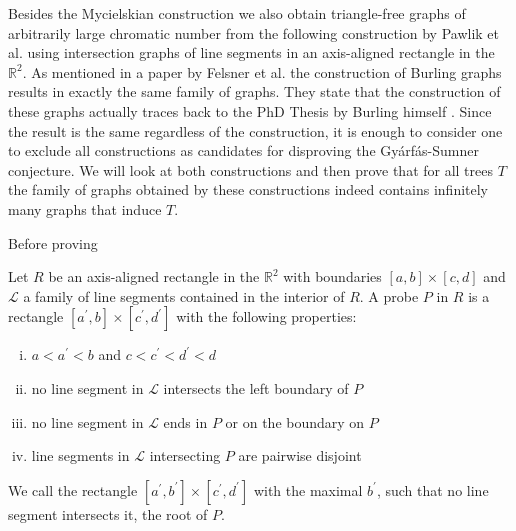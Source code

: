 Besides the Mycielskian construction we also obtain triangle-free graphs of arbitrarily large chromatic number from the following construction by Pawlik et al. \cite{Paw14} using intersection graphs of line segments in an axis-aligned rectangle in the $\mathbb{R}^2$. As mentioned in a paper by Felsner et al. \cite{Fe18} the construction of Burling graphs results in exactly the same family of graphs. They state that the construction of these graphs actually traces back to the PhD Thesis by Burling himself \cite{Bu65}. Since the result is the same regardless of the construction, it is enough to consider one to exclude all constructions as candidates for disproving the Gyárfás-Sumner conjecture. We will look at both constructions and then prove that for all trees $T$ the family of graphs obtained by these constructions indeed contains infinitely many graphs that induce $T$.

Before proving 

\begin{defn}
Let $R$ be an axis-aligned rectangle in the $\mathbb{R}^2$ with boundaries $[a,b]\times [c,d]$ and $\mathcal{L}$ a family of line segments contained in the interior of $R$. A probe $P$ in $R$ is a rectangle $[a^\prime ,b]\times [c^\prime ,d^\prime]$ with the following properties:
\begin{enumerate}[(i)]
\item $a<a^\prime < b$ and $c<c^\prime <d^\prime < d$
\item no line segment in $\mathcal{L}$ intersects the left boundary of $P$
\item no line segment in $\mathcal{L}$ ends in $P$ or on the boundary on $P$
\item line segments in $\mathcal{L}$ intersecting $P$ are pairwise disjoint
\end{enumerate}
We call the rectangle $[a^\prime ,b^\prime ]\times [c^\prime ,d^\prime]$ with the maximal $b^\prime$, such that no line segment intersects it, the root of $P$.
\end{defn}

